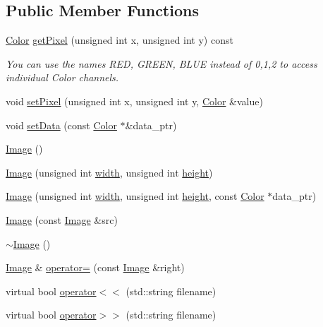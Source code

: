 \subsection*{Public Member Functions}
\begin{DoxyCompactItemize}
\item 
\hyperlink{classmath_1_1_vec3}{Color} \hyperlink{classimaging_1_1_image_acb9fc398bbd5224553cccd7458f73279}{get\+Pixel} (unsigned int x, unsigned int y) const
\begin{DoxyCompactList}\small\item\em You can use the names R\+ED, G\+R\+E\+EN, B\+L\+UE instead of 0,1,2 to access individual Color channels. \end{DoxyCompactList}\item 
void \hyperlink{classimaging_1_1_image_af46eb162fc02880e06d5029cb4c9b540}{set\+Pixel} (unsigned int x, unsigned int y, \hyperlink{classmath_1_1_vec3}{Color} \&value)
\item 
void \hyperlink{classimaging_1_1_image_a5f586aaf4180937982608c9d48f0ae67}{set\+Data} (const \hyperlink{classmath_1_1_vec3}{Color} $\ast$\&data\+\_\+ptr)
\item 
\hyperlink{classimaging_1_1_image_abd5fddfa49e3430c610cef4ed34ce099}{Image} ()
\item 
\hyperlink{classimaging_1_1_image_aefa58d670974137c9409fa26b6c2c12e}{Image} (unsigned int \hyperlink{classmath_1_1_array_aac107e42abccdfb484b0544e6a860c10}{width}, unsigned int \hyperlink{classmath_1_1_array_a80b79625a8f11cbc63843376b591360c}{height})
\item 
\hyperlink{classimaging_1_1_image_a029a91e59afb23b851cbdc43da68d0dd}{Image} (unsigned int \hyperlink{classmath_1_1_array_aac107e42abccdfb484b0544e6a860c10}{width}, unsigned int \hyperlink{classmath_1_1_array_a80b79625a8f11cbc63843376b591360c}{height}, const \hyperlink{classmath_1_1_vec3}{Color} $\ast$data\+\_\+ptr)
\item 
\hyperlink{classimaging_1_1_image_abc4a034190e1217c8e84d217611d1c97}{Image} (const \hyperlink{classimaging_1_1_image}{Image} \&src)
\item 
\hyperlink{classimaging_1_1_image_a4d646bedf388ac5d13b53e3a190ca949}{$\sim$\+Image} ()
\item 
\hyperlink{classimaging_1_1_image}{Image} \& \hyperlink{classimaging_1_1_image_a58df2b10b12f72089effb8fa945d174c}{operator=} (const \hyperlink{classimaging_1_1_image}{Image} \&right)
\item 
virtual bool \hyperlink{classimaging_1_1_image_ac9ad6b7cf9eabf0c99decc03dac24694}{operator$<$$<$} (std\+::string filename)
\item 
virtual bool \hyperlink{classimaging_1_1_image_aeaf5fcad3d1b49a0f127e0d88dfce5e3}{operator$>$$>$} (std\+::string filename)
\end{DoxyCompactItemize}
